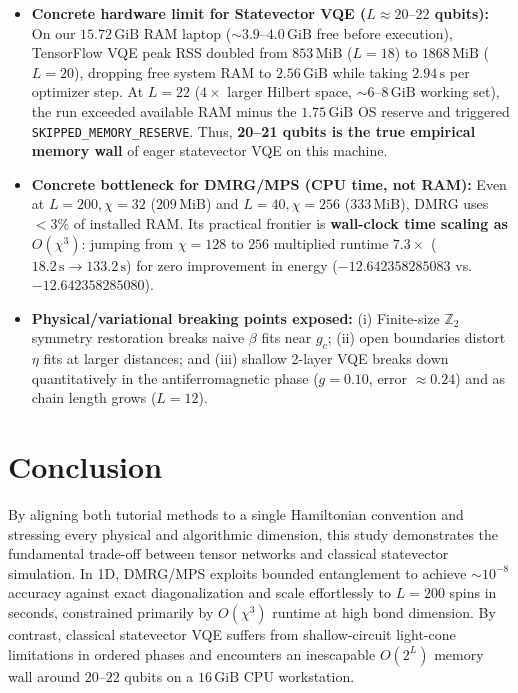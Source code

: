 \documentclass[11pt,a4paper]{article}
\begin{document}
\begin{itemize}[leftmargin=*]
\item \textbf{Concrete hardware limit for Statevector VQE ($L \approx 20\text{--}22$ qubits):} On our $15.72\,\mathrm{GiB}$ RAM laptop ($\sim 3.9\text{--}4.0\,\mathrm{GiB}$ free before execution), TensorFlow VQE peak RSS doubled from $853\,\mathrm{MiB}$ ($L=18$) to $1868\,\mathrm{MiB}$ ($L=20$), dropping free system RAM to $2.56\,\mathrm{GiB}$ while taking $2.94\,\mathrm{s}$ per optimizer step. At $L=22$ ($4\times$ larger Hilbert space, $\sim 6\text{--}8\,\mathrm{GiB}$ working set), the run exceeded available RAM minus the $1.75\,\mathrm{GiB}$ OS reserve and triggered \texttt{SKIPPED\_MEMORY\_RESERVE}. Thus, \textbf{20--21 qubits is the true empirical memory wall} of eager statevector VQE on this machine.
\item \textbf{Concrete bottleneck for DMRG/MPS (CPU time, not RAM):} Even at $L=200,\chi=32$ ($209\,\mathrm{MiB}$) and $L=40,\chi=256$ ($333\,\mathrm{MiB}$), DMRG uses $<3\%$ of installed RAM. Its practical frontier is \textbf{wall-clock time scaling as $O(\chi^3)$}: jumping from $\chi=128$ to $256$ multiplied runtime $7.3\times$ ($18.2\,\mathrm{s} \to 133.2\,\mathrm{s}$) for zero improvement in energy ($-12.642358285083$ vs.\ $-12.642358285080$).
\item \textbf{Physical/variational breaking points exposed:} (i) Finite-size $\mathbb{Z}_2$ symmetry restoration breaks naive $\beta$ fits near $g_c$; (ii) open boundaries distort $\eta$ fits at larger distances; and (iii) shallow 2-layer VQE breaks down quantitatively in the antiferromagnetic phase ($g=0.10$, error $\approx 0.24$) and as chain length grows ($L=12$).
\end{itemize}

\section{Conclusion}
By aligning both tutorial methods to a single Hamiltonian convention and stressing every physical and algorithmic dimension, this study demonstrates the fundamental trade-off between tensor networks and classical statevector simulation. In 1D, DMRG/MPS exploits bounded entanglement to achieve $\sim 10^{-8}$ accuracy against exact diagonalization and scale effortlessly to $L=200$ spins in seconds, constrained primarily by $O(\chi^3)$ runtime at high bond dimension. By contrast, classical statevector VQE suffers from shallow-circuit light-cone limitations in ordered phases and encounters an inescapable $O(2^L)$ memory wall around $20\text{--}22$ qubits on a $16\,\mathrm{GiB}$ CPU workstation.
\end{document}
